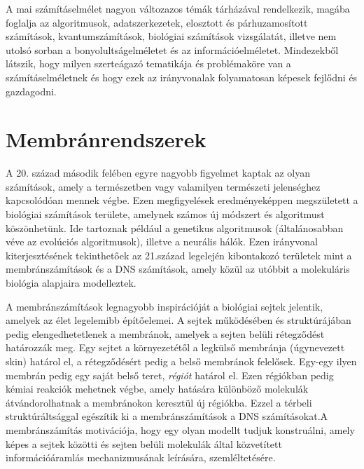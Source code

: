 

A mai számításelmélet nagyon változazos témák tárházával rendelkezik, 
magába foglalja az algoritmusok, adatszerkezetek, elosztott és párhuzamosított számítások, kvantumszámítások, biológiai számítások vizsgálatát, illetve nem utolsó sorban a bonyolultságelméletet és az információelméletet.
Mindezekből látszik, hogy milyen szerteágazó tematikája és problémaköre van a számításelméletnek és hogy ezek az irányvonalak folyamatosan képesek fejlődni és gazdagodni.

\section{Membránrendszerek}

A 20. század második felében egyre nagyobb figyelmet kaptak az olyan számítások, amely a természetben vagy valamilyen természeti jelenséghez kapcsolódóan mennek végbe. Ezen megfigyelések eredményeképpen megszületett a biológiai számítások területe, amelynek számos új módszert és algoritmust köszönhetünk. Ide tartoznak például a genetikus algoritmusok (általánosabban véve az evolúciós algoritmusok), illetve a neurális hálók. Ezen irányvonal kiterjesztésének tekinthetőek az 21.század legelején kibontakozó területek mint a membránszámítások és a DNS számítások, amely közül az utóbbit a molekuláris biológia alapjaira modelleztek.

A membránszámítások legnagyobb inspirációját a biológiai sejtek jelentik, amelyek az élet legelemibb építőelemei. A sejtek működésében és struktúrájában pedig elengedhetetlenek a membránok, amelyek a sejten belüli rétegződést határozzák meg. Egy sejtet a környezetétől a legkülső membránja (úgynevezett skin) határol el, a rétegződésért pedig a belső membránok felelősek.  Egy-egy ilyen membrán pedig egy saját belső teret, \textit{régiót} határol el.
Ezen régiókban pedig kémiai reakciók mehetnek végbe, amely hatására különböző molekulák átvándorolhatnak a membránokon keresztül új régiókba. Ezzel a térbeli struktúráltsággal egészítik ki a membránszámítások a DNS számításokat.A  membránszámítás motivációja, hogy egy olyan modellt tudjuk konstruálni, amely képes a sejtek közötti és sejten belüli molekulák által közvetített információáramlás mechanizmusának leírására, szemléltetésére.


